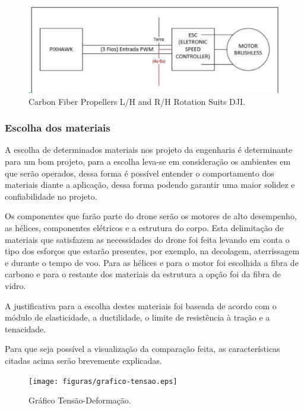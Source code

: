 \begin{figure}[H]
    \centering
      \includegraphics[keepaspectratio=true,scale=0.5]{figuras/elice.eps}
    \caption{Carbon Fiber Propellers L/H and R/H Rotation Suits DJI. \cite{dji}}
    \label{fig:diagramaEstru}
\end{figure}

\subsubsection{Escolha dos materiais}

A escolha de determinados materiais nos projeto da engenharia é determinante para um bom projeto, para a escolha leva-se em  consideração os ambientes em que serão operados, dessa forma é possível entender o comportamento dos materiais diante a aplicação, dessa forma podendo garantir uma maior solidez e confiabilidade no projeto.

Os componentes que farão parte do drone serão os motores de alto desempenho, as hélices, componentes elétricos e a estrutura do corpo. Esta delimitação de materiais que satisfazem as necessidades do drone foi feita levando  em conta o tipo dos esforços que estarão  presentes,  por exemplo, na decolagem, aterrissagem  e durante o tempo  de voo. Para as hélices e para  o motor foi escolhida  a fibra de carbono  e para  o restante dos materiais da estrutura a opção foi da fibra de vidro.

A justificativa para a escolha destes materiais foi baseada de acordo com o módulo de elasticidade, a ductilidade, o limite de resistência à tração e a tenacidade. 

Para que seja possível a visualização da comparação feita, as características citadas acima serão brevemente explicadas.


\begin{figure}[H]
    \centering
      \texttt{[image: figuras/grafico-tensao.eps]}
    \caption{Gráfico Tensão-Deformação.}
    \label{fig:grafico-tensao}
\end{figure}

